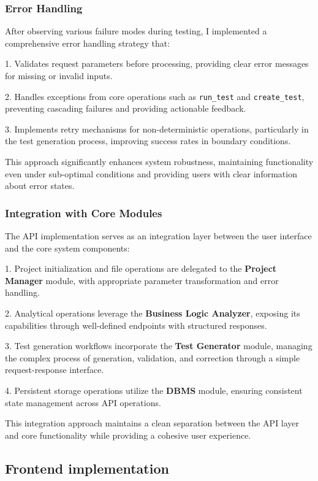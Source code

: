 \subsubsection{Error Handling}

After observing various failure modes during testing, I implemented a comprehensive error handling strategy that:

1. Validates request parameters before processing, providing clear error messages for missing or invalid inputs.

2. Handles exceptions from core operations such as \texttt{run\_test} and \texttt{create\_test}, preventing cascading failures and providing actionable feedback.

3. Implements retry mechanisms for non-deterministic operations, particularly in the test generation process, improving success rates in boundary conditions.

This approach significantly enhances system robustness, maintaining functionality even under sub-optimal conditions and providing users with clear information about error states.

\subsubsection{Integration with Core Modules}

The API implementation serves as an integration layer between the user interface and the core system components:

1. Project initialization and file operations are delegated to the \textbf{Project Manager} module, with appropriate parameter transformation and error handling.

2. Analytical operations leverage the \textbf{Business Logic Analyzer}, exposing its capabilities through well-defined endpoints with structured responses.

3. Test generation workflows incorporate the \textbf{Test Generator} module, managing the complex process of generation, validation, and correction through a simple request-response interface.

4. Persistent storage operations utilize the \textbf{DBMS} module, ensuring consistent state management across API operations.

This integration approach maintains a clean separation between the API layer and core functionality while providing a cohesive user experience.

\subsection{Frontend implementation}

